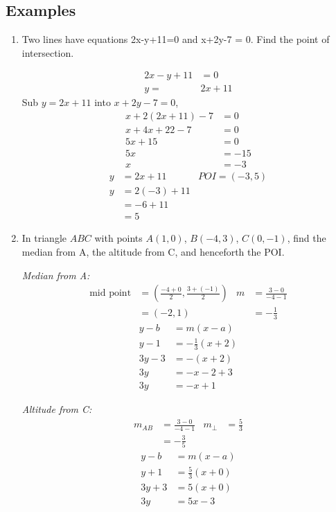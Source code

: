\subsection{Examples}
\begin{enumerate}
	\item
	Two lines have equations 2x-y+11=0 and x+2y-7 = 0. Find the point of intersection.
	
	\begin{align*}
		2x-y+11&=0\\
		y=&2x+11
	\end{align*}
	Sub $y=2x+11$ into $x+2y-7=0$,
	\begin{align*}
		x+2(2x+11)-7&=0\\
		x+4x+22-7&=0\\
		5x+15&=0\\
		5x&=-15\\
		x&=-3
	\end{align*}
	\begin{align*}
		y&=2x+11 & POI=(-3,5)\\
		y&=2(-3)+11\\
		&=-6+11\\
		&=5
	\end{align*}
	
	\item
	In triangle $ABC$ with points $A(1,0)$, $B(-4,3)$, $C(0,-1)$, find the median from A, the altitude from C, and henceforth the POI.
	
	\textit{Median from A:}
	\begin{align*}
		\text{mid point} &= \left(\frac{-4+0}{2},\frac{3+(-1)}{2}\right) & m &= \frac{3-0}{-4-1} \\
		&= (-2,1) & &=-\frac{1}{3}
	\end{align*}
	\begin{align*}
		y-b&=m(x-a)\\
		y-1&=-\frac{1}{3}\left(x+2\right)\\
		3y-3&=-\left(x+2\right)\\
		3y&=-x-2+3\\
		3y&=-x+1
	\end{align*}
	
	\textit{Altitude from C:}
	\begin{align*}
		m_{AB}&=\frac{3-0}{-4-1} & m_\perp&=\frac{5}{3} \\
		&=-\frac{3}{5}
	\end{align*}
	\begin{align*}
		y-b&=m(x-a)\\
		y+1&=\frac{5}{3}\left(x+0\right)\\
		3y+3&=5\left(x+0\right)\\
		3y&=5x-3
	\end{align*}
	

\end{enumerate}
